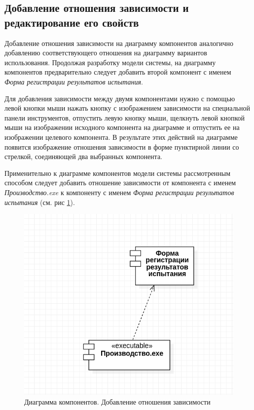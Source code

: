 \documentclass[a4paper,12pt]{report}
\begin{document}
\subsection*{Добавление отношения зависимости и редактирование его свойств}
Добавление отношения зависимости на диаграмму компонентов аналогично добавлению соответствующего отношения на диаграмму вариантов использования. Продолжая разработку модели системы, на диаграмму компонентов предварительно следует добавить второй компонент с именем \textit{Форма регистрации результатов испытания}. 

Для добавления зависимости между двумя компонентами нужно с помощью левой кнопки мыши нажать кнопку с изображением зависимости на специальной панели инструментов, отпустить левую кнопку мыши, щелкнуть левой кнопкой мыши на изображении исходного компонента на диаграмме и отпустить ее на изображении целевого компонента. В результате этих действий на диаграмме появится изображение отношения зависимости в форме пунктирной линии со стрелкой, соединяющей два выбранных компонента.

Применительно к диаграмме компонентов модели системы рассмотренным способом следует добавить отношение зависимости от компонента с именем \textit{Производство.exe} к компоненту с именем \textit{Форма регистрации результатов испытания} (см. рис \ref{fig:componentstests}).

\begin{figure}
	\centering
	\includegraphics[width=0.5\linewidth]{images/componentstests1}
	\caption{Диаграмма компонентов. Добавление отношения зависимости}
	\label{fig:componentstests}
\end{figure}
\end{document}
